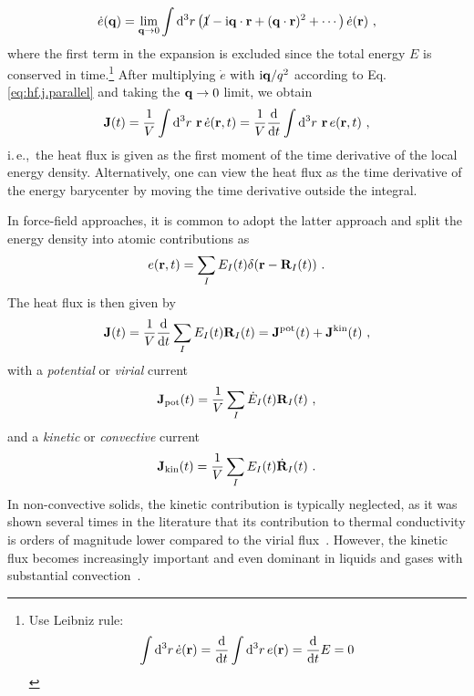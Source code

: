 \begin{align}
	\dot{e} (\b q) 
		= \lim_{\b q \to 0} \int \d^3 r \left(\cancel{1} - \im \b q \cdot \b r + (\b q \cdot \b r)^2 + \cdots \right) \dot{e} (\b r)~,
	\label{eq:hf.e.lw}
\end{align}
where the first term in the expansion is excluded since the total energy $E$ is conserved in time.\footnote{Use Leibniz rule:
\begin{align*}
	\int {\rm d}^3 r \, \dot{e} ({\bf r}) = \frac{{\rm d}}{{\rm d} t} \int {\rm d}^3 r \, e ({\bf r}) = \frac{{\rm d}}{{\rm d} t} E = 0
\end{align*}
}
After multiplying $\dot e$ with ${\rm i} {\bf q} / q^2$ according to Eq.\,\eqref{eq:hf.j.parallel} and taking the ${\bf q} \to 0$ limit, we obtain
\begin{align}
	\b J (t) 
		= \frac{1}{V} \int \d^3 r ~ \b r \, \dot{e} (\b r, t)
		= \frac{1}{V} \frac{\d}{\d t} \int \d^3 r ~ \b r \, e (\b r, t)
	~,
	\label{eq:hf.J}
\end{align}
i.\,e.,~the heat flux is given as the first moment of the time derivative of the local energy density. Alternatively, one can view the heat flux as the time derivative of the energy barycenter by moving the time derivative outside the integral.

In force-field approaches, it is common to adopt the latter approach and split the energy density into atomic contributions as
\begin{align}
	e (\b r, t ) = \sum_I E_I (t) \delta (\b r - \b R_I (t))~.
	\label{eq:hf.e.atomic}
\end{align}
The heat flux is then given by~\cite{Helfand1960}
\begin{align}
	\b J (t) 
		= \frac{1}{V} \frac{\d}{\d t} \sum_I E_I(t) \b R_I(t)
		= {\bf J}^{\rm pot} (t) + {\bf J}^{\rm kin} (t)~,
	\label{eq:hf.J.atomic}
\end{align}
with a \emph{potential} or \emph{virial} current
\begin{align}
	{\bf J}_{\rm pot} (t)
		= \frac{1}{V} \sum_I \dot{E}_I (t) \b R_I (t)~,
	\label{eq:J_pot}
\end{align}
and a \emph{kinetic} or \emph{convective} current
\begin{align}
	{\bf J}_{\rm kin} (t)
		= \frac{1}{V} \sum_I E_I (t) \dot{\b R}_I (t)~.
	\label{eq:J_kin}
\end{align}
In non-convective solids, the kinetic contribution is typically neglected, as it was shown several times in the literature that its contribution to thermal conductivity is orders of magnitude lower compared to the virial flux~\cite{Vogelsang1987,Kinaci2012}. However, the kinetic flux becomes increasingly important and even dominant in liquids and gases with substantial convection~\cite{Cheng2020}.

